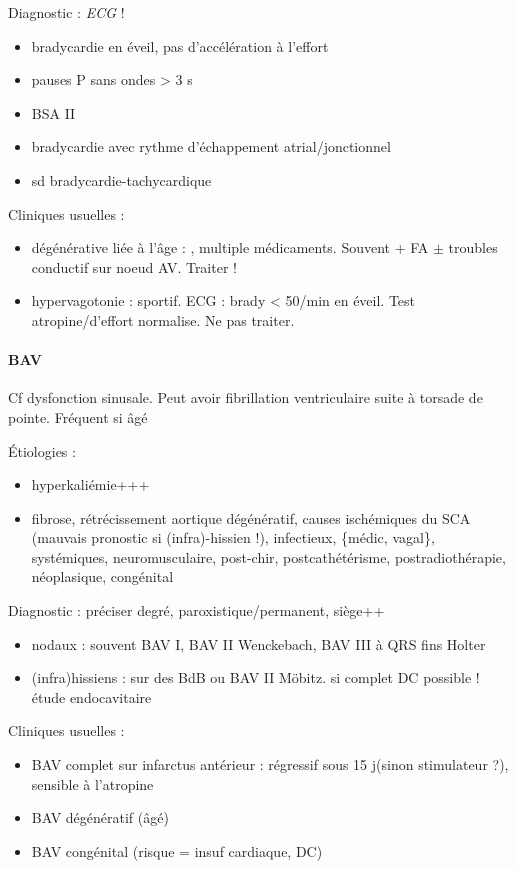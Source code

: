 \documentclass{article}
\begin{document}
Diagnostic : \textit{ECG} ! 
\begin{itemize}
  \item bradycardie en éveil, pas d'accélération à l'effort
  \item pauses P sans ondes > 3 s
  \item BSA II
  \item bradycardie avec rythme d'échappement atrial/jonctionnel
  \item sd bradycardie-tachycardique
\end{itemize}

Cliniques usuelles :
\begin{itemize}
  \item dégénérative liée à l'âge : \female, multiple médicaments. Souvent + FA
    $\pm$ troubles conductif sur noeud AV. Traiter !
  \item hypervagotonie : sportif. ECG : brady < 50/min en éveil. Test
    atropine/d'effort normalise. Ne pas traiter.
\end{itemize}

\paragraph{BAV}
Cf dysfonction sinusale. Peut avoir fibrillation ventriculaire suite à torsade
de pointe. Fréquent si âgé

Étiologies :
\begin{itemize}
\item hyperkaliémie+++ 
\item fibrose, rétrécissement aortique dégénératif, causes ischémiques
du SCA (mauvais pronostic si (infra)-hissien !), infectieux, \{médic, vagal\},
systémiques, neuromusculaire, post-chir, postcathétérisme, postradiothérapie,
néoplasique, congénital
\end{itemize}

Diagnostic : préciser degré, paroxistique/permanent, siège++ 
\begin{itemize}
  \item nodaux : souvent BAV I, BAV II Wenckebach, BAV III à QRS fins \thus
   Holter
  \item (infra)hissiens : sur des BdB ou BAV II Möbitz. \skull{} si complet DC
    possible !\\
    \thus étude endocavitaire
\end{itemize}

Cliniques usuelles :
\begin{itemize}
  \item BAV complet sur infarctus antérieur : régressif sous 15 j(sinon stimulateur ?),
    sensible à l'atropine
  \item BAV dégénératif (âgé)
  \item BAV congénital (risque = insuf cardiaque, DC)
\end{itemize}
\end{document}
